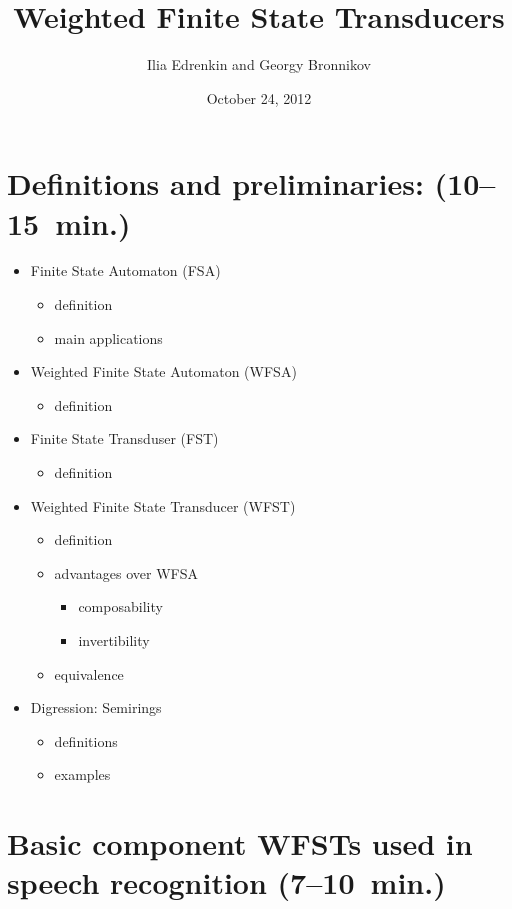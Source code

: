 \documentclass{beamer}
\title{Weighted Finite State Transducers}
\author{Ilia Edrenkin and Georgy Bronnikov}
\date{October 24, 2012}
\newcommand{\<}{\langle}
\renewcommand{\>}{\rangle}
\begin{document}
\maketitle

\section{Definitions and preliminaries: (10--15~min.)}

\begin{frame}
  \begin{itemize}
  \item Finite State Automaton (FSA)
    \begin{itemize}
    \item definition
    \item main applications
    \end{itemize}
  \item Weighted Finite State Automaton (WFSA)
    \begin{itemize}
    \item definition
    \end{itemize}
  \item Finite State Transduser (FST)
    \begin{itemize}
    \item definition
    \end{itemize}
  \item Weighted Finite State Transducer (WFST)
    \begin{itemize}
    \item definition
    \item advantages over WFSA
      \begin{itemize}
      \item composability
      \item invertibility
      \end{itemize}
    \item equivalence
    \end{itemize}
  \item Digression: Semirings
    \begin{itemize}
    \item definitions
    \item examples
    \end{itemize}
  \end{itemize}
\end{frame}

\section{Basic component WFSTs used in speech recognition (7--10~min.)}
\end{document}
